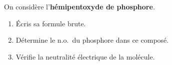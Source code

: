 \documentclass[11pt,a4paper]{article}
\begin{document}
\begin{exo}
On considère l'\textbf{hémipentoxyde de phosphore}.
\begin{enumerate}[label=\alph*)]
  \item Écris sa formule brute.
  \item Détermine le n.o.\ du phosphore dans ce composé.
  \item Vérifie la neutralité électrique de la molécule.
\end{enumerate}
\end{exo}
\end{document}
